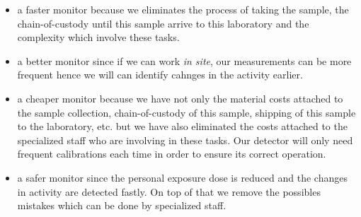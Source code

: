 \begin{itemize}
\item{} a faster monitor because we eliminates the process of taking the sample, the chain-of-custody until this sample arrive to this laboratory and the complexity which involve these tasks. 

\item{} a better monitor since if we can work \textit{in site}, our measurements can be more frequent hence we will can identify cahnges in the activity earlier.

\item{} a cheaper monitor because we have not only the material costs attached to the sample collection, chain-of-custody of this sample, shipping of this sample to the laboratory, etc. but we have also eliminated the costs attached to the specialized staff who are involving in these tasks. Our detector will only need frequent calibrations each time in order to ensure its correct operation.

\item{} a safer monitor since the personal exposure dose is reduced and the changes in activity are detected fastly. On top of that we remove the possibles mistakes which can be done by specialized staff.

\end{itemize} 